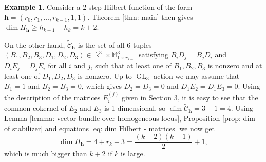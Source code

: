 \documentclass[11pt]{amsart}
\theoremstyle{definition}
\newtheorem{ex}[thm]{Example}
\DeclareMathOperator{\GL}{GL}
\newcommand{\h}{\mathbf{h}}
\newcommand{\tcC}{\widetilde{\mathscr{C}}}
\begin{document}
\begin{ex}
Consider a 2-step Hilbert function of the form $\h=(r_0,r_1,\ldots ,r_{k-1},1,1)$. Theorem \ref{thm: main} then gives $\dim H_\h\ge h_{k+1}-h_k=k+2$.

On the other hand, $\tcC_\h$ is the set of all 6-tuples $(B_1,B_2,B_3,D_1,D_2,D_3)\in \Bbbk^3\times \mathbb{M}_{1\times r_{k-1}}^3$ satisfying $B_iD_j=B_jD_i$ and $D_iE_j=D_jE_i$ for all $i$ and $j$, such that at least one of $B_1,B_2,B_3$ is nonzero and at least one of $D_1,D_2,D_3$ is nonzero. Up to $\GL_3$-action we may assume that $B_1=1$ and $B_2=B_3=0$, which gives $D_2=D_3=0$ and $D_1E_2=D_1E_3=0$. Using the description of the matrices $E_i^{(j)}$ given in Section 3, it is easy to see that the common cokernel of $E_2$ and $E_3$ is 1-dimensional, so $\dim \tcC_\h=3+1=4$. Using Lemma \ref{lemma: vector bundle over homogeneous locus}, Proposition \ref{prop: dim of stabilizer} and equations \eqref{eq: dim Hilbert - matrices} we now get
$$\dim H_\h= 4+r_k-3=\frac{(k+2)(k+1)}{2}+1,$$
which is much bigger than $k+2$ if $k$ is large.
\end{ex}
\end{document}
